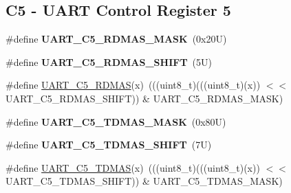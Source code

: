\subsection*{C5 -\/ U\+A\+RT Control Register 5}
\begin{DoxyCompactItemize}
\item 
\mbox{\label{group___u_a_r_t___register___masks_gaef3503f3521ec37397d2d19e7da7bd58}} 
\#define {\bfseries U\+A\+R\+T\+\_\+\+C5\+\_\+\+R\+D\+M\+A\+S\+\_\+\+M\+A\+SK}~(0x20\+U)
\item 
\mbox{\label{group___u_a_r_t___register___masks_gab95d268a11167ac6ab4cf41332bf5aa6}} 
\#define {\bfseries U\+A\+R\+T\+\_\+\+C5\+\_\+\+R\+D\+M\+A\+S\+\_\+\+S\+H\+I\+FT}~(5\+U)
\item 
\#define \mbox{\hyperlink{group___u_a_r_t___register___masks_ga3e482d8d4ea645ab1cb89bad9c899194}{U\+A\+R\+T\+\_\+\+C5\+\_\+\+R\+D\+M\+AS}}(x)~(((uint8\+\_\+t)(((uint8\+\_\+t)(x)) $<$$<$ U\+A\+R\+T\+\_\+\+C5\+\_\+\+R\+D\+M\+A\+S\+\_\+\+S\+H\+I\+FT)) \& U\+A\+R\+T\+\_\+\+C5\+\_\+\+R\+D\+M\+A\+S\+\_\+\+M\+A\+SK)
\item 
\mbox{\label{group___u_a_r_t___register___masks_ga593bf2d9f1d2a222d8cbde7b88aba833}} 
\#define {\bfseries U\+A\+R\+T\+\_\+\+C5\+\_\+\+T\+D\+M\+A\+S\+\_\+\+M\+A\+SK}~(0x80\+U)
\item 
\mbox{\label{group___u_a_r_t___register___masks_gadf4f03768249772994b3082c369698e7}} 
\#define {\bfseries U\+A\+R\+T\+\_\+\+C5\+\_\+\+T\+D\+M\+A\+S\+\_\+\+S\+H\+I\+FT}~(7\+U)
\item 
\#define \mbox{\hyperlink{group___u_a_r_t___register___masks_gaea4ac16ae4172f75bf05eb28f8bcd6d5}{U\+A\+R\+T\+\_\+\+C5\+\_\+\+T\+D\+M\+AS}}(x)~(((uint8\+\_\+t)(((uint8\+\_\+t)(x)) $<$$<$ U\+A\+R\+T\+\_\+\+C5\+\_\+\+T\+D\+M\+A\+S\+\_\+\+S\+H\+I\+FT)) \& U\+A\+R\+T\+\_\+\+C5\+\_\+\+T\+D\+M\+A\+S\+\_\+\+M\+A\+SK)
\end{DoxyCompactItemize}
